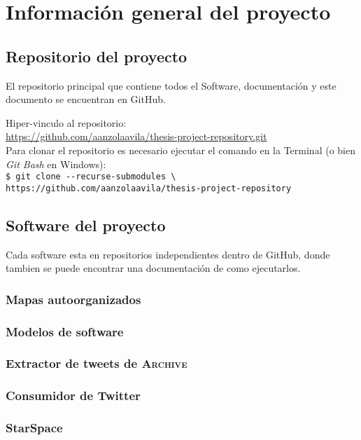 
\chapter{Información general del proyecto} %

\label{appendix:projectinfo} %

\section{Repositorio del proyecto}
El repositorio principal que contiene todos el Software, documentación y este documento se encuentran en GitHub. \\

\begin{tcolorbox}[colback=gray!5!white,
  colframe=black!75!white,
  title=Repositorio de GitHub]
  Hiper-vinculo al repositorio: \\
  \hspace*{1em} \href{https://github.com/aanzolaavila/thesis-project-repository.git}{https://github.com/aanzolaavila/thesis-project-repository.git} \\ [1em]

  Para clonar el repositorio es necesario ejecutar el comando en la Terminal (o bien \textit{Git Bash} en Windows): \\
  \hspace*{1em} {\tt \small {\verb!$ git clone --recurse-submodules \!} \\ \hspace*{2em}
    {\verb!https://github.com/aanzolaavila/thesis-project-repository!}}
\end{tcolorbox}

\section{Software del proyecto}
Cada software esta en repositorios independientes dentro de GitHub, donde tambien se puede encontrar una documentación de como ejecutarlos.

\subsection{Mapas autoorganizados}

\subsection{Modelos de software}

\subsection{Extractor de tweets de \textsc{Archive}}

\subsection{Consumidor de Twitter}

\subsection{StarSpace}

